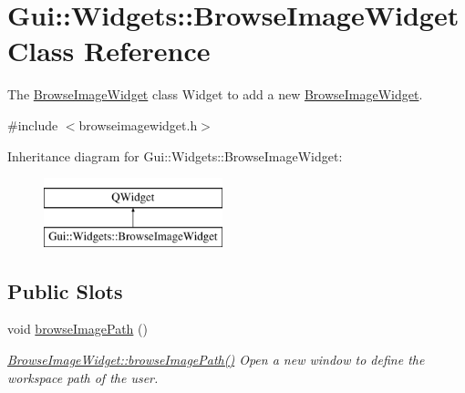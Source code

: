\hypertarget{classGui_1_1Widgets_1_1BrowseImageWidget}{\section{Gui\-:\-:Widgets\-:\-:Browse\-Image\-Widget Class Reference}
\label{classGui_1_1Widgets_1_1BrowseImageWidget}
}


The \hyperlink{classGui_1_1Widgets_1_1BrowseImageWidget}{Browse\-Image\-Widget} class Widget to add a new \hyperlink{classGui_1_1Widgets_1_1BrowseImageWidget}{Browse\-Image\-Widget}.  




{\ttfamily \#include $<$browseimagewidget.\-h$>$}

Inheritance diagram for Gui\-:\-:Widgets\-:\-:Browse\-Image\-Widget\-:\begin{figure}[H]
\begin{center}
\leavevmode
\includegraphics[height=2.000000cm]{d1/d4f/classGui_1_1Widgets_1_1BrowseImageWidget}
\end{center}
\end{figure}
\subsection*{Public Slots}
\begin{DoxyCompactItemize}
\item 
\hypertarget{classGui_1_1Widgets_1_1BrowseImageWidget_a5bde0525741081465b73c31b53c0cddf}{void \hyperlink{classGui_1_1Widgets_1_1BrowseImageWidget_a5bde0525741081465b73c31b53c0cddf}{browse\-Image\-Path} ()}\label{classGui_1_1Widgets_1_1BrowseImageWidget_a5bde0525741081465b73c31b53c0cddf}

\begin{DoxyCompactList}\small\item\em \hyperlink{classGui_1_1Widgets_1_1BrowseImageWidget_a5bde0525741081465b73c31b53c0cddf}{Browse\-Image\-Widget\-::browse\-Image\-Path()} Open a new window to define the workspace path of the user. \end{DoxyCompactList}\end{DoxyCompactItemize}
